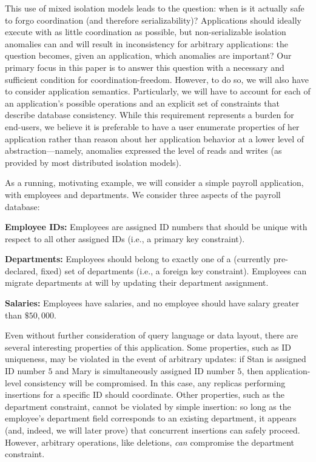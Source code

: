 This use of mixed isolation models leads to the question: when is it
actually safe to forgo coordination (and therefore serializability)?
Applications should ideally execute with as little coordination as
possible, but non-serializable isolation anomalies can and will result
in inconsistency for arbitrary applications: the question becomes,
given an application, which anomalies are important? Our primary focus
in this paper is to answer this question with a necessary and
sufficient condition for coordination-freedom. However, to do so, we
will also have to consider application semantics. Particularly, we
will have to account for each of an application's possible operations
and an explicit set of constraints that describe database
consistency. While this requirement represents a burden for end-users,
we believe it is preferable to have a user enumerate properties of her
application rather than reason about her application behavior at a
lower level of abstraction---namely, anomalies expressed the level of
reads and writes (as provided by most distributed isolation models).




 As a running, motivating example, we will
consider a simple payroll application, with employees and
departments. We consider three aspects of the payroll database:
\begin{myitemize}
\item\textbf{Employee IDs:} Employees are assigned ID numbers that
  should be unique with respect to all other assigned IDs (i.e., a
  primary key constraint).
\item\textbf{Departments:} Employees should belong to exactly one of a
  (currently pre-declared, fixed) set of departments (i.e., a foreign
  key constraint). Employees can migrate departments at will by
  updating their department assignment.
\item\textbf{Salaries:} Employees have salaries, and no employee
  should have salary greater than $\$50,000$.
\end{myitemize}
Even without further consideration of query language or data layout,
there are several interesting properties of this application. Some
properties, such as ID uniqueness, may be violated in the event of
arbitrary updates: if Stan is assigned ID number $5$ and Mary is
simultaneously assigned ID number $5$, then application-level
consistency will be compromised. In this case, any replicas performing
insertions for a specific ID should coordinate. Other properties, such
as the department constraint, cannot be violated by simple insertion:
so long as the employee's department field corresponds to an existing
department, it appears (and, indeed, we will later prove) that
concurrent insertions can safely proceed. However, arbitrary
operations, like deletions, \textit{can} compromise the department
constraint.

